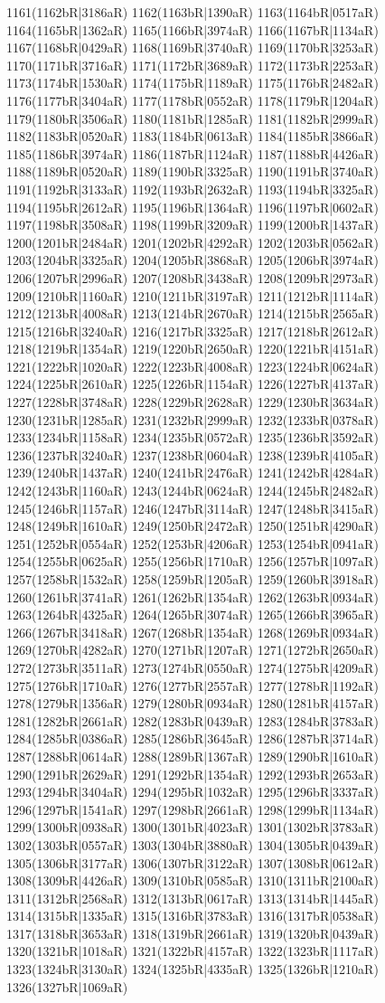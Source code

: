1161(1162bR|3186aR) 1162(1163bR|1390aR) 1163(1164bR|0517aR) 1164(1165bR|1362aR) 1165(1166bR|3974aR) 1166(1167bR|1134aR) 1167(1168bR|0429aR) 1168(1169bR|3740aR) 1169(1170bR|3253aR) 1170(1171bR|3716aR) 1171(1172bR|3689aR) 1172(1173bR|2253aR) 1173(1174bR|1530aR) 1174(1175bR|1189aR) 1175(1176bR|2482aR) 1176(1177bR|3404aR) 1177(1178bR|0552aR) 1178(1179bR|1204aR) 1179(1180bR|3506aR) 1180(1181bR|1285aR) 1181(1182bR|2999aR) 1182(1183bR|0520aR) 1183(1184bR|0613aR) 1184(1185bR|3866aR) 1185(1186bR|3974aR) 1186(1187bR|1124aR) 1187(1188bR|4426aR) 1188(1189bR|0520aR) 1189(1190bR|3325aR) 1190(1191bR|3740aR) 1191(1192bR|3133aR) 1192(1193bR|2632aR) 1193(1194bR|3325aR) 1194(1195bR|2612aR) 1195(1196bR|1364aR) 1196(1197bR|0602aR) 1197(1198bR|3508aR) 1198(1199bR|3209aR) 1199(1200bR|1437aR) 1200(1201bR|2484aR) 1201(1202bR|4292aR) 1202(1203bR|0562aR) 1203(1204bR|3325aR) 1204(1205bR|3868aR) 1205(1206bR|3974aR) 1206(1207bR|2996aR) 1207(1208bR|3438aR) 1208(1209bR|2973aR) 1209(1210bR|1160aR) 1210(1211bR|3197aR) 1211(1212bR|1114aR) 1212(1213bR|4008aR) 1213(1214bR|2670aR) 1214(1215bR|2565aR) 1215(1216bR|3240aR) 1216(1217bR|3325aR) 1217(1218bR|2612aR) 1218(1219bR|1354aR) 1219(1220bR|2650aR) 1220(1221bR|4151aR) 1221(1222bR|1020aR) 1222(1223bR|4008aR) 1223(1224bR|0624aR) 1224(1225bR|2610aR) 1225(1226bR|1154aR) 1226(1227bR|4137aR) 1227(1228bR|3748aR) 1228(1229bR|2628aR) 1229(1230bR|3634aR) 1230(1231bR|1285aR) 1231(1232bR|2999aR) 1232(1233bR|0378aR) 1233(1234bR|1158aR) 1234(1235bR|0572aR) 1235(1236bR|3592aR) 1236(1237bR|3240aR) 1237(1238bR|0604aR) 1238(1239bR|4105aR) 1239(1240bR|1437aR) 1240(1241bR|2476aR) 1241(1242bR|4284aR) 1242(1243bR|1160aR) 1243(1244bR|0624aR) 1244(1245bR|2482aR) 1245(1246bR|1157aR) 1246(1247bR|3114aR) 1247(1248bR|3415aR) 1248(1249bR|1610aR) 1249(1250bR|2472aR) 1250(1251bR|4290aR) 1251(1252bR|0554aR) 1252(1253bR|4206aR) 1253(1254bR|0941aR) 1254(1255bR|0625aR) 1255(1256bR|1710aR) 1256(1257bR|1097aR) 1257(1258bR|1532aR) 1258(1259bR|1205aR) 1259(1260bR|3918aR) 1260(1261bR|3741aR) 1261(1262bR|1354aR) 1262(1263bR|0934aR) 1263(1264bR|4325aR) 1264(1265bR|3074aR) 1265(1266bR|3965aR) 1266(1267bR|3418aR) 1267(1268bR|1354aR) 1268(1269bR|0934aR) 1269(1270bR|4282aR) 1270(1271bR|1207aR) 1271(1272bR|2650aR) 1272(1273bR|3511aR) 1273(1274bR|0550aR) 1274(1275bR|4209aR) 1275(1276bR|1710aR) 1276(1277bR|2557aR) 1277(1278bR|1192aR) 1278(1279bR|1356aR) 1279(1280bR|0934aR) 1280(1281bR|4157aR) 1281(1282bR|2661aR) 1282(1283bR|0439aR) 1283(1284bR|3783aR) 1284(1285bR|0386aR) 1285(1286bR|3645aR) 1286(1287bR|3714aR) 1287(1288bR|0614aR) 1288(1289bR|1367aR) 1289(1290bR|1610aR) 1290(1291bR|2629aR) 1291(1292bR|1354aR) 1292(1293bR|2653aR) 1293(1294bR|3404aR) 1294(1295bR|1032aR) 1295(1296bR|3337aR) 1296(1297bR|1541aR) 1297(1298bR|2661aR) 1298(1299bR|1134aR) 1299(1300bR|0938aR) 1300(1301bR|4023aR) 1301(1302bR|3783aR) 1302(1303bR|0557aR) 1303(1304bR|3880aR) 1304(1305bR|0439aR) 1305(1306bR|3177aR) 1306(1307bR|3122aR) 1307(1308bR|0612aR) 1308(1309bR|4426aR) 1309(1310bR|0585aR) 1310(1311bR|2100aR) 1311(1312bR|2568aR) 1312(1313bR|0617aR) 1313(1314bR|1445aR) 1314(1315bR|1335aR) 1315(1316bR|3783aR) 1316(1317bR|0538aR) 1317(1318bR|3653aR) 1318(1319bR|2661aR) 1319(1320bR|0439aR) 1320(1321bR|1018aR) 1321(1322bR|4157aR) 1322(1323bR|1117aR) 1323(1324bR|3130aR) 1324(1325bR|4335aR) 1325(1326bR|1210aR) 1326(1327bR|1069aR) 